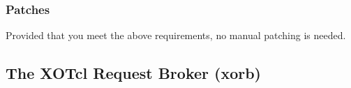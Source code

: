 	\subsubsection{Patches}
	Provided that you meet the above requirements, no manual
        patching is needed.
	\subsection{The XOTcl Request Broker (xorb)}
